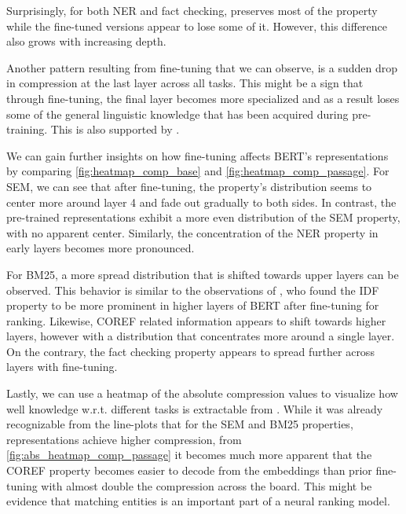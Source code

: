 Surprisingly, for both NER and fact checking,  preserves most of the property while the fine-tuned versions appear to lose some of it. However, this difference also grows with increasing depth.

Another pattern resulting from fine-tuning that we can observe, is a sudden drop in compression at the last layer across all tasks. This might be a sign that through fine-tuning, the final layer becomes more specialized and as a result loses some of the general linguistic knowledge that has been acquired during pre-training. This is also supported by \cite{merchant-etal-2020-happens}.

We can gain further insights on how fine-tuning affects BERT's representations by comparing \autoref{fig:heatmap_comp_base} and \autoref{fig:heatmap_comp_passage}. For SEM, we can see that after fine-tuning, the property's distribution seems to center more around layer 4 and fade out gradually to both sides. In contrast, the pre-trained representations exhibit a more even distribution of the SEM property, with no apparent center. Similarly, the concentration of the NER property in early layers becomes more pronounced.

For BM25, a more spread distribution that is shifted towards upper layers can be observed. This behavior is similar to the observations of \cite{https://doi.org/10.48550/arxiv.2202.12191}, who found the IDF property to be more prominent in higher layers of BERT after fine-tuning for ranking. Likewise, COREF related information appears to shift towards higher layers, however with a distribution that concentrates more around a single layer. On the contrary, the fact checking property appears to spread further across layers with fine-tuning.

Lastly, we can use a heatmap of the absolute compression values to visualize how well knowledge w.r.t. different tasks is extractable from . While it was already recognizable from the line-plots that for the SEM and BM25 properties,  representations achieve higher compression, from \autoref{fig:abs_heatmap_comp_passage} it becomes much more apparent that the COREF property becomes easier to decode from the embeddings than prior fine-tuning with almost double the compression across the board. This might be evidence that matching entities is an important part of a neural ranking model.



